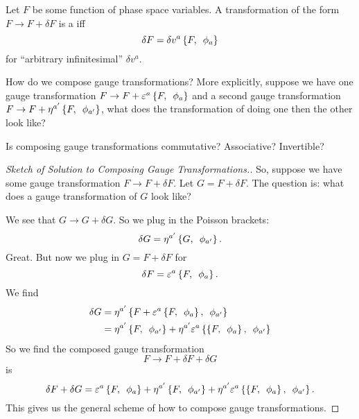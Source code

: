 \label{n:constrained:attempted-defn-of-gauge-transformation}
Let $F$ be some function of phase space variables. A transformation of
the form $F\to F + \delta F$ is a  iff
\begin{equation}
\delta F = \delta v^{a}\left\{F,\enspace\phi_{a}\right\}
\end{equation}
for ``arbitrary infinitesimal'' $\delta v^{a}$.

How do we compose gauge transformations? More explicitly, suppose we
have one gauge transformation $F\to F + \varepsilon^{a}\left\{F,\enspace\phi_{a}\right\}$
and a second gauge transformation $F\to F + \eta^{a'}\left\{F,\enspace\phi_{a'}\right\}$,
what does the transformation of doing one then the other look like? 

Is composing gauge transformations commutative? Associative? Invertible?

\begin{proof}[Sketch of Solution to Composing Gauge Transformations.]
So, suppose we have some gauge transformation $F\to F+\delta F$. Let
$G=F+\delta F$. The question is: what does a gauge transformation of $G$
look like?

We see that $G\to G+\delta G$. So we plug in the Poisson brackets:
\begin{equation}
\delta G = \eta^{a'}\left\{G,\enspace\phi_{a'}\right\}.
\end{equation}
Great. But now we plug in $G=F+\delta F$ for 
\begin{equation}
\delta F = \varepsilon^{a}\left\{F,\enspace\phi_{a}\right\}.
\end{equation}
We find
\begin{equation}
\begin{split}
\delta G &= \eta^{a'}\left\{F+\varepsilon^{a}\left\{F,\enspace\phi_{a}\right\},\enspace\phi_{a'}\right\}\\
&= \eta^{a'}\left\{F,\enspace\phi_{a'}\right\}+\eta^{a'}\varepsilon^{a}\left\{\left\{F,\enspace\phi_{a}\right\},\enspace\phi_{a'}\right\}
\end{split}
\end{equation}
So we find the composed gauge transformation
\begin{equation}
F\to F + \delta F + \delta G
\end{equation}
is
\begin{equation}
\delta F + \delta G = \varepsilon^{a}\left\{F,\enspace\phi_{a}\right\}+\eta^{a'}\left\{F,\enspace\phi_{a'}\right\}+\eta^{a'}\varepsilon^{a}\left\{\left\{F,\enspace\phi_{a}\right\},\enspace\phi_{a'}\right\}.
\end{equation}
This gives us the general scheme of how to compose gauge transformations.
\end{proof}

